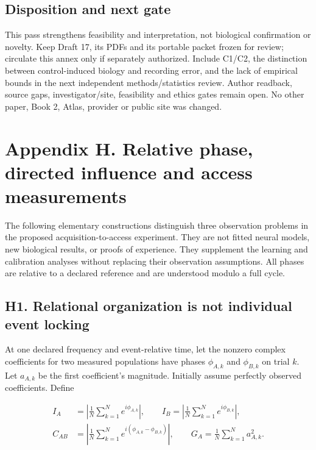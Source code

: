 \documentclass[
  american,
  11pt,
  letterpaper,
]{article}
\begin{document}
\subsection{Disposition and next gate}\label{disposition-and-next-gate}

This pass strengthens feasibility and interpretation, not biological confirmation or novelty. Keep Draft 17, its PDFs and its portable packet frozen for review; circulate this annex only if separately authorized. Include C1/C2, the distinction between control-induced biology and recording error, and the lack of empirical bounds in the next independent methods/statistics review. Author readback, source gaps, investigator/site, feasibility and ethics gates remain open. No other paper, Book 2, Atlas, provider or public site was changed.

\clearpage
\hypertarget{appendix-h}{}

\section{Appendix H. Relative phase, directed influence and access measurements}\label{appendix-h.-relative-phase-directed-influence-and-access-measurements}

The following elementary constructions distinguish three observation problems in the proposed acquisition-to-access experiment. They are not fitted neural models, new biological results, or proofs of experience. They supplement the learning and calibration analyses without replacing their observation assumptions. All phases are relative to a declared reference and are understood modulo a full cycle.

\subsection{H1. Relational organization is not individual event locking}\label{h1.-relational-organization-is-not-individual-event-locking}

At one declared frequency and event-relative time, let the nonzero complex coefficients for two measured populations have phases \(\phi_{A,k}\) and \(\phi_{B,k}\) on trial \(k\). Let \(a_{A,k}\) be the first coefficient's magnitude. Initially assume perfectly observed coefficients. Define

\begin{equation}
\begin{aligned}
I_A&=\left|\frac{1}{N}\sum_{k=1}^{N}e^{i\phi_{A,k}}\right|,\qquad
I_B=\left|\frac{1}{N}\sum_{k=1}^{N}e^{i\phi_{B,k}}\right|,\\
C_{AB}&=\left|\frac{1}{N}\sum_{k=1}^{N}e^{i(\phi_{A,k}-\phi_{B,k})}\right|,\qquad
G_A=\frac{1}{N}\sum_{k=1}^{N}a_{A,k}^{2}.
\end{aligned}\tag{H1}
\end{equation}
\end{document}
